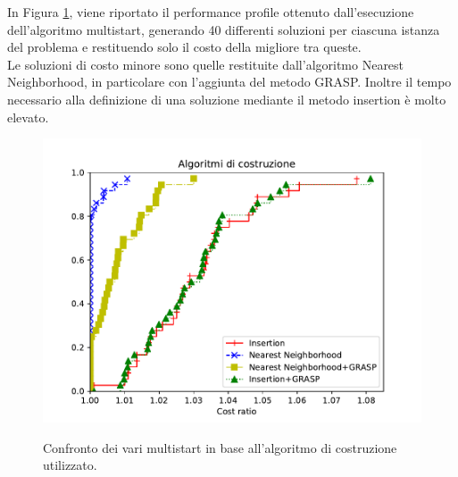 In Figura \ref{pp_construction}, viene riportato il performance profile ottenuto dall'esecuzione dell'algoritmo multistart, generando 40 differenti soluzioni per ciascuna istanza del problema e restituendo solo il costo della migliore tra queste.\\
Le soluzioni di costo minore sono quelle restituite dall'algoritmo Nearest Neighborhood, in particolare con l'aggiunta del metodo GRASP. 
Inoltre il tempo necessario alla definizione di una soluzione mediante il metodo insertion è molto elevato. 
\begin{figure}[h] 
\begin{center} 
  \includegraphics[scale=0.8]{Images/pp_construction}\\ 
  \caption{\footnotesize{Confronto dei vari multistart in base all'algoritmo di costruzione utilizzato.}}
  \label{pp_construction} 
\end{center} 
\end{figure}
